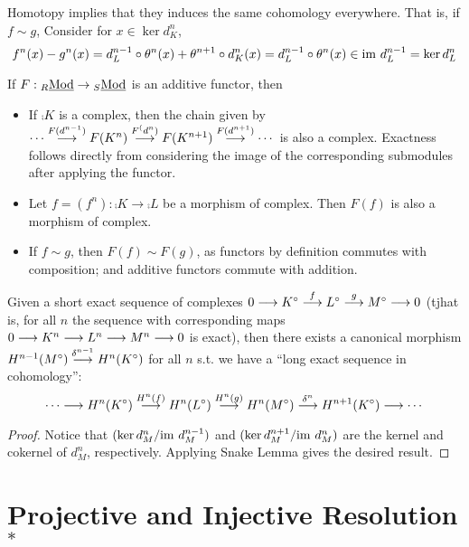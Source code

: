 \begin{remark}
    Homotopy implies that they induces the same cohomology everywhere. That is, if $f \sim g$, Consider for $x \in \ker d_K^n$,
    \[
        f^n(x) - g^n(x) = d_L^{n-1} \circ \theta^n(x) + \theta^{n+1} \circ d_K^n(x) = d_L^{n-1} \circ \theta^n(x) \in \mathrm{im}\  d_L^{n-1} = \ker d_L^n
    \]
\end{remark}

\begin{remark}
    If $F: {}_{R}\underline{\textup{Mod}} \to {}_{S}\underline{\textup{Mod}}$ is an additive functor, then
    \begin{itemize}
        \item If $\comp{K}$ is a complex, then the chain given by $\cdots \overset{F(d^{n-1})}{\longrightarrow} F(K^n) \overset{F^(d^n)}{\longrightarrow} F(K^{n+1}) \overset{F(d^{n+1})}{\longrightarrow} \cdots$ is also a complex. Exactness follows directly from considering the image of the corresponding submodules after applying the functor.
        \item Let $f = (f^n): \comp{K} \to \comp{L}$ be a morphism of complex. Then $F(f)$ is also a morphism of complex. 
        \item If $f \sim g$, then $F(f) \sim F(g)$, as functors by definition commutes with composition; and additive functors commute with addition.
    \end{itemize}
\end{remark}

\begin{proposition}
    Given a short exact sequence of complexes $0 \longrightarrow K^{\circ} \overset{f}{\longrightarrow} L^{\circ} \overset{g}{\longrightarrow} M^{\circ} \longrightarrow 0$ (tjhat is, for all $n$ the sequence with corresponding maps $0 \longrightarrow K^n \longrightarrow L^n \longrightarrow M^n \longrightarrow 0$ is exact), then there exists a canonical morphism $H^{n-1}(M^{\circ}) \overset{\delta^{n-1}}{\longrightarrow} H^n(K^{\circ})$ for all $n$ s.t. we have a ``long exact sequence in cohomology'':
    \[
        \cdots \longrightarrow H^n(K^{\circ}) \overset{H^n(f)}{\longrightarrow} H^n(L^{\circ}) \overset{H^n(g)}{\longrightarrow} H^n(M^{\circ}) \overset{\delta^n}{\longrightarrow} H^{n+1}(K^{\circ}) \longrightarrow \cdots
    \]
\end{proposition}

\begin{proof}
    Notice that $(\ker d_M^n/\mathrm{im}\  d_M^{n-1})$ and $(\ker d_M^{n+1}/\mathrm{im}\  d_M^n)$ are the kernel and cokernel of $d_M^n$, respectively. Applying Snake Lemma gives the desired result.
\end{proof}

\section{Projective and Injective Resolution$^*$}

